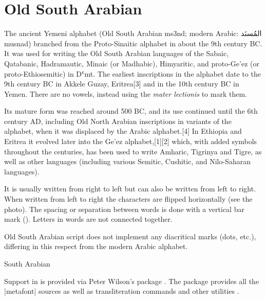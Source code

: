 \section{Old South Arabian}
\label{s:oldsoutharabian}


\newfontfamily{}

The ancient Yemeni alphabet (Old South Arabian ms3nd; modern Arabic: {\arabicfont المُسنَد‎}  musnad) branched from the Proto-Sinaitic alphabet in about the 9th century BC. It was used for writing the Old South Arabian languages of the Sabaic, Qatabanic, Hadramautic, Minaic (or Madhabic), Himyaritic, and proto-Ge'ez (or proto-Ethiosemitic) in Dʿmt. The earliest inscriptions in the alphabet date to the 9th century BC in Akkele Guzay, Eritrea[3] and in the 10th century BC in Yemen. There are no vowels, instead using the \emph{mater lectionis} to mark them.

Its mature form was reached around 500 BC, and its use continued until the 6th century AD, including Old North Arabian inscriptions in variants of the alphabet, when it was displaced by the Arabic alphabet.[4] In Ethiopia and Eritrea it evolved later into the Ge'ez alphabet,[1][2] which, with added symbols throughout the centuries, has been used to write Amharic, Tigrinya and Tigre, as well as other languages (including various Semitic, Cushitic, and Nilo-Saharan languages).

It is usually written from right to left but can also be written from left to right. When written from left to right the characters are flipped horizontally (see the photo).
The spacing or separation between words is done with a vertical bar mark (\textbar).
Letters in words are not connected together.

Old South Arabian script does not implement any diacritical marks (dots, etc.), differing in this respect from the modern Arabic alphabet.

\begin{scriptexample}[]{South Arabian}
\end{scriptexample}

Support in \latexe is provided via Peter Wilson's package . The package provides all the |metafont| sources as well as transliteration commands and other utilities .

